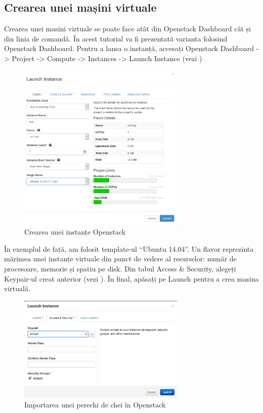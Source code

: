 \subsection{Crearea unei mașini virtuale}
\label{sec:vm-openstack-createvm}

Crearea unei masini virtuale se poate face atât din Openstack Dashboard cât și
din linia de comandă. În acest tutorial va fi prezentată varianta folosind
Openstack Dashboard. Pentru a lansa o instanță, accesați Openstack Dashboard ->
Project -> Compute -> Instances -> Launch Instance (vezi
)

\begin{figure}[!htbp]
	\centering
	\includegraphics[width=8cm]{chapters/14-vm/img/openstack-info-img.png}
	\caption{Crearea unei instanțe Openstack}
	\label{fig:vm-openstack-info-img}
\end{figure}

În exemplul de față, am folosit template-ul “Ubuntu 14.04”. Un flavor reprezinta
mărimea unei instanțe virtuale din punct de vedere al resurselor: număr de
procesoare, memorie și spatiu pe disk. Din tabul Access \& Security, alegeți
Keypair-ul creat anterior (vezi
). În final, apăsați pe Launch
pentru a crea mașina virtuală.

\begin{figure}[!htbp]
	\centering
	\includegraphics[width=8cm]{chapters/14-vm/img/openstack-keychoice-img.png}
	\caption{Importarea unei perechi de chei în Openstack}
	\label{fig:vm-openstack-keychoice}
\end{figure}

